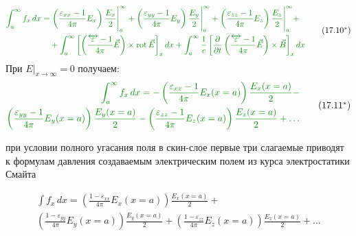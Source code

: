 \documentclass[a4paper,12pt]{article}
\newcommand{\modtext}[1]{\textcolor{modcolor}{#1}}
\newcommand{\modmath}[1]{\textcolor{modcolor}{#1}}
\newcommand{\modblock}[1]{\colorbox{modcolor!10}{\parbox{\dimexpr\linewidth-2\fboxsep}{#1}}}
\begin{document}
\modblock{
\modtext{
    \begin{equation}
    \modmath{
        \begin{aligned}
        \int_{a}^{\infty} f_x\,dx &=
        \left(\frac{\varepsilon_{xx} - 1}{4\pi}E_x\right)\frac{E_x}{2}\Bigg|_{a}^{\infty} +
        \left(\frac{\varepsilon_{yy} - 1}{4\pi}E_y\right)\frac{E_y}{2}\Bigg|_{a}^{\infty} +
        \left(\frac{\varepsilon_{zz} - 1}{4\pi}E_z\right)\frac{E_z}{2}\Bigg|_{a}^{\infty} + \\
        &\quad + \int_{a}^{\infty}\left[\left(\frac{\overleftrightarrow{\varepsilon} - 1}{4\pi}\vec{E}\right) \times \text{rot}\,\vec{E}\right]_x dx +
        \int_{a}^{\infty}\frac{1}{c}\left[\frac{\partial}{\partial t}\left(\frac{\overleftrightarrow{\varepsilon} - 1}{4\pi}\vec{E}\right) \times \vec{B}\right]_x dx
        \end{aligned}
    }
    \tag{17.10$^*$}
    \end{equation}
    При $E|_{x\to\infty} = 0$ получаем:
    \begin{equation}
    \modmath{
        \begin{aligned}
        \int_{a}^{\infty} f_x\,dx =
        -\left(\frac{\varepsilon_{xx} - 1}{4\pi}E_x(x=a)\right)\frac{E_x(x=a)}{2} -\\
        \left(\frac{\varepsilon_{yy} - 1}{4\pi}E_y(x=a)\right)\frac{E_y(x=a)}{2} -
        \left(\frac{\varepsilon_{zz} - 1}{4\pi}E_z(x=a)\right)\frac{E_z(x=a)}{2} + \ldots
        \end{aligned}
    }
    \tag{17.11$^*$}
    \end{equation}
}
}

\noindent
при условии полного угасания поля в скин-слое первые три слагаемые приводят
к формулам давления создаваемым электрическим полем из курса электростатики Смайта

\begin{equation}
\begin{aligned}
\int f_x\,dx =
\left(\frac{1 - \varepsilon_{xx}}{4\pi}E_x(x=a)\right)\frac{E_x(x=a)}{2} + \\
\left(\frac{1 - \varepsilon_{yy}}{4\pi}E_y(x=a)\right)\frac{E_y(x=a)}{2} +
\left(\frac{1 - \varepsilon_{zz}}{4\pi}E_z(x=a)\right)\frac{E_z(x=a)}{2} + \ldots
\end{aligned}
\tag{17.12}
\end{equation}

\end{document}
